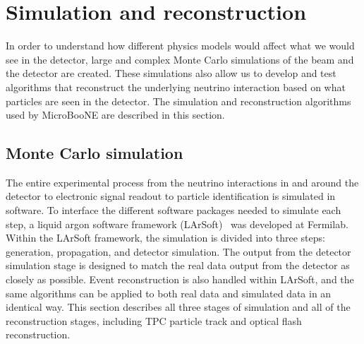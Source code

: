 \section{Simulation and reconstruction}\label{sc:simreco}
In order to understand how different physics models would affect what we would
see in the detector, large and complex Monte Carlo simulations of the beam and
the detector are created.  These simulations also allow us to develop and test
algorithms that reconstruct the underlying neutrino interaction based on what
particles are seen in the detector. The simulation and reconstruction
algorithms used by MicroBooNE are described in this section.


\subsection{Monte Carlo simulation}\label{sec:simulation}
  The entire experimental process from the neutrino interactions in and around
  the detector to electronic signal readout to particle identification is
  simulated in software. To interface the different software packages needed to
  simulate each step, a liquid argon software framework
  (LArSoft)~\cite{larsoft} was developed at Fermilab. Within the LArSoft
  framework, the simulation is divided into three steps: generation,
  propagation, and detector simulation.  The output from the detector
  simulation stage is designed to match the real data output from the detector
  as closely as possible. Event reconstruction is also handled within LArSoft,
  and the same algorithms can be applied to both real data and simulated data
  in an identical way. This section describes all three stages of simulation
  and all of the reconstruction stages, including TPC particle track and
  optical flash reconstruction.

